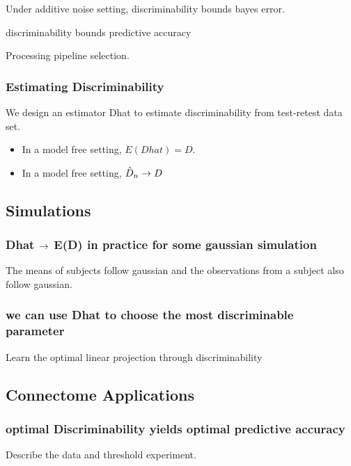 \documentclass{article}
\begin{document}
 Under additive noise setting, discriminability bounds bayes error.

\begin{thm}
discriminability bounds predictive accuracy
\end{thm}

 Processing pipeline selection.

\subsubsection{Estimating Discriminability}

 We design an estimator Dhat to estimate discriminability from test-retest data set.

\begin{itemize}

\item In a model free setting, $E(Dhat)=D$.

\item In a model free setting, $\hat{D}_n \rightarrow D$
\end{itemize}


\subsection{Simulations}


\subsubsection{Dhat $\rightarrow$ E(D) in practice for some gaussian simulation}
 The means of subjects follow gaussian and the observations from a subject also follow gaussian. 



\subsubsection{we can use Dhat to choose the most discriminable parameter }
 Learn the optimal linear projection through discriminability




\subsection{Connectome Applications}

\subsubsection{optimal Discriminability yields optimal predictive accuracy}
 Describe the data and threshold experiment. 
\end{document}
